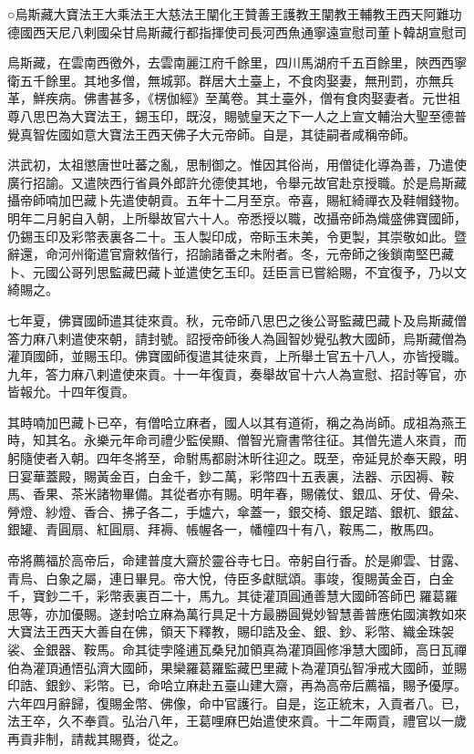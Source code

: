 
\begin{pinyinscope}
○烏斯藏大寶法王大乘法王大慈法王闡化王贊善王護教王闡教王輔教王西天阿難功德國西天尼八剌國朵甘烏斯藏行都指揮使司長河西魚通寧遠宣慰司董卜韓胡宣慰司

烏斯藏，在雲南西徼外，去雲南麗江府千餘里，四川馬湖府千五百餘里，陜西西寧衛五千餘里。其地多僧，無城郭。群居大土臺上，不食肉娶妻，無刑罰，亦無兵革，鮮疾病。佛書甚多，《楞伽經》至萬卷。其土臺外，僧有食肉娶妻者。元世祖尊八思巴為大寶法王，錫玉印，既沒，賜號皇天之下一人之上宣文輔治大聖至德普覺真智佐國如意大寶法王西天佛子大元帝師。自是，其徒嗣者咸稱帝師。

洪武初，太祖懲唐世吐蕃之亂，思制御之。惟因其俗尚，用僧徒化導為善，乃遣使廣行招諭。又遣陜西行省員外郎許允德使其地，令舉元故官赴京授職。於是烏斯藏攝帝師喃加巴藏卜先遣使朝貢。五年十二月至京。帝喜，賜紅綺禪衣及鞋帽錢物。明年二月躬自入朝，上所舉故官六十人。帝悉授以職，改攝帝師為熾盛佛寶國師，仍錫玉印及彩幣表裏各二十。玉人製印成，帝眎玉未美，令更製，其崇敬如此。暨辭還，命河州衛遣官齎敕偕行，招諭諸番之未附者。冬，元帝師之後鎖南堅巴藏卜、元國公哥列思監藏巴藏卜並遣使乞玉印。廷臣言已嘗給賜，不宜復予，乃以文綺賜之。

七年夏，佛寶國師遣其徒來貢。秋，元帝師八思巴之後公哥監藏巴藏卜及烏斯藏僧答力麻八剌遣使來朝，請封號。詔授帝師後人為圓智妙覺弘教大國師，烏斯藏僧為灌頂國師，並賜玉印。佛寶國師復遣其徒來貢，上所舉土官五十八人，亦皆授職。九年，答力麻八剌遣使來貢。十一年復貢，奏舉故官十六人為宣慰、招討等官，亦皆報允。十四年復貢。

其時喃加巴藏卜已卒，有僧哈立麻者，國人以其有道術，稱之為尚師。成祖為燕王時，知其名。永樂元年命司禮少監侯顯、僧智光齎書幣往征。其僧先遣人來貢，而躬隨使者入朝。四年冬將至，命駙馬都尉沐昕往迎之。既至，帝延見於奉天殿，明日宴華蓋殿，賜黃金百，白金千，鈔二萬，彩幣四十五表裏，法器、示因褥、鞍馬、香果、茶米諸物畢備。其從者亦有賜。明年春，賜儀仗、銀瓜、牙仗、骨朵、膋燈、紗燈、香合、拂子各二，手爐六，傘蓋一，銀交椅、銀足踏、銀杌、銀盆、銀罐、青圓扇、紅圓扇、拜褥、帳幄各一，幡幢四十有八，鞍馬二，散馬四。

帝將薦福於高帝后，命建普度大齋於靈谷寺七日。帝躬自行香。於是卿雲、甘露、青烏、白象之屬，連日畢見。帝大悅，侍臣多獻賦頌。事竣，復賜黃金百，白金千，寶鈔二千，彩幣表裏百二十，馬九。其徒灌頂圓通善慧大國師答師巴羅葛羅思等，亦加優賜。遂封哈立麻為萬行具足十方最勝圓覺妙智慧善普應佑國演教如來大寶法王西天大善自在佛，領天下釋教，賜印誥及金、銀、鈔、彩幣、織金珠袈裟、金銀器、鞍馬。命其徒孛隆逋瓦桑兒加領真為灌頂圓修凈慧大國師，高日瓦禪伯為灌頂通悟弘濟大國師，果欒羅葛羅監藏巴里藏卜為灌頂弘智凈戒大國師，並賜印誥、銀鈔、彩幣。已，命哈立麻赴五臺山建大齋，再為高帝后薦福，賜予優厚。六年四月辭歸，復賜金幣、佛像，命中官護行。自是，迄正統末，入貢者八。已，法王卒，久不奉貢。弘治八年，王葛哩麻巴始遣使來貢。十二年兩貢，禮官以一歲再貢非制，請裁其賜賚，從之。


\end{pinyinscope}
